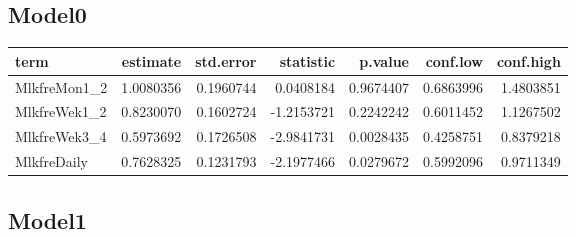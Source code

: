 \documentclass[
]{article}
\newenvironment{Shaded}{\begin{snugshade}}{\end{snugshade}}
\newcommand{\DataTypeTok}[1]{\textcolor[rgb]{0.13,0.29,0.53}{#1}}
\newcommand{\KeywordTok}[1]{\textcolor[rgb]{0.13,0.29,0.53}{\textbf{#1}}}
\newcommand{\NormalTok}[1]{#1}
\newcommand{\OperatorTok}[1]{\textcolor[rgb]{0.81,0.36,0.00}{\textbf{#1}}}
\newcommand{\OtherTok}[1]{\textcolor[rgb]{0.56,0.35,0.01}{#1}}
\newcommand{\StringTok}[1]{\textcolor[rgb]{0.31,0.60,0.02}{#1}}
\begin{document}
\hypertarget{model0-6}{%
\subsection{Model0}\label{model0-6}}

\begin{Shaded}
\end{Shaded}

\begin{longtable}[]{@{}lrrrrrr@{}}
\toprule
term & estimate & std.error & statistic & p.value & conf.low &
conf.high\tabularnewline
\midrule
\endhead
MlkfreMon1\_2 & 1.0080356 & 0.1960744 & 0.0408184 & 0.9674407 &
0.6863996 & 1.4803851\tabularnewline
MlkfreWek1\_2 & 0.8230070 & 0.1602724 & -1.2153721 & 0.2242242 &
0.6011452 & 1.1267502\tabularnewline
MlkfreWek3\_4 & 0.5973692 & 0.1726508 & -2.9841731 & 0.0028435 &
0.4258751 & 0.8379218\tabularnewline
MlkfreDaily & 0.7628325 & 0.1231793 & -2.1977466 & 0.0279672 & 0.5992096
& 0.9711349\tabularnewline
\bottomrule
\end{longtable}

\hypertarget{model1-6}{%
\subsection{Model1}\label{model1-6}}

\begin{Shaded}
\end{Shaded}
\end{document}
